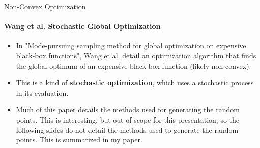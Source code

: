 \documentclass{beamer}
\begin{document}
%	
	\begin{frame}{Non-Convex Optimization}
		\framesubtitle{Wang et al. Stochastic Global Optimization}
		\begin{itemize}
			\item In "Mode-pursuing sampling method for global optimization on expensive black-box functions", Wang et al. detail an optimization algorithm that finds the global optimum of an expensive black-box function (likely non-convex).
			\item This is a kind of \textbf{stochastic optimization}, which uses a stochastic process in its evaluation.
			\item Much of this paper details the methods used for generating the random points. This is interesting, but out of scope for this presentation, so the following slides do not detail the methods used to generate the random points. This is summarized in my paper.
		\end{itemize}
	\end{frame}
%	
\end{document}
